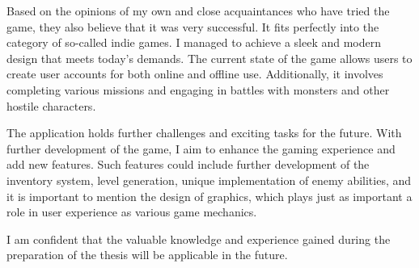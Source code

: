 Based on the opinions of my own and close acquaintances who have tried the game, they also believe that it was very successful. It fits perfectly into the category of so-called indie games. I managed to achieve a sleek and modern design that meets today's demands. The current state of the game allows users to create user accounts for both online and offline use. Additionally, it involves completing various missions and engaging in battles with monsters and other hostile characters.

The application holds further challenges and exciting tasks for the future. With further development of the game, I aim to enhance the gaming experience and add new features. Such features could include further development of the inventory system, level generation, unique implementation of enemy abilities, and it is important to mention the design of graphics, which plays just as important a role in user experience as various game mechanics.

I am confident that the valuable knowledge and experience gained during the preparation of the thesis will be applicable in the future.